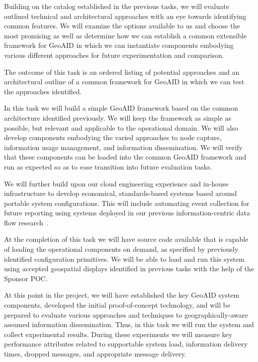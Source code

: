 \documentclass{sbir}
\begin{document}
Building on the catalog established in the previous tasks, we will evaluate outlined technical and architectural approaches with an eye towards identifying common features. We will examine the options available to us and choose the most promising as well as determine how we can establish a common extensible framework for GeoAID in which we can instantiate components embodying various different approaches for future experimentation and comparison.

The outcome of this task is an ordered listing of potential approaches and an architectural outline of a common framework for GeoAID in which we can test the approaches identified.

In this task we will build a simple GeoAID framework based on the common architecture identified previously. We will keep the framework as simple as possible, but relevant and applicable to the operational domain. We will also develop components embodying the varied approaches to node capture, information usage management, and information dissemination. We will verify that these components can be loaded into the common GeoAID framework and run as expected so as to ease transition into future evaluation tasks. 

We will further build upon our cloud engineering experience and in-house infrastructure to develop economical, standards-based systems based around portable system configurations. This will include automating event collection for future reporting using systems deployed in our previous information-centric data flow research~\cite{LaHe:12b}. 

At the completion of this task we will have source code available that is capable of loading the operational components on demand, as specified by previously identified configuration primitives. We will be able to load and run this system using accepted geospatial displays identified in previous tasks with the help of the Sponsor POC.

At this point in the project, we will have established the key GeoAID system components, developed the initial proof-of-concept technology, and will be prepared to evaluate various approaches and techniques to geographically-aware assumed information dissemination. Thus, in this task we will run the system and collect experimental results. During these experiments we will measure key performance attributes related to supportable system load, information delivery times, dropped messages, and appropriate message delivery. 
\end{document}
